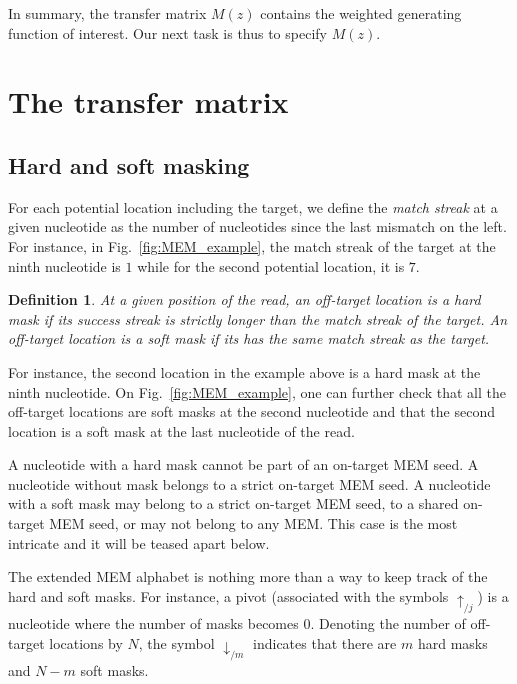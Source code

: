 \documentclass{article}
\newtheorem{definition}{Definition}
\begin{document}
In summary, the transfer matrix $M(z)$ contains the weighted generating
function of interest. Our next task is thus to specify $M(z)$.



\section{The transfer matrix}
\label{sec:transfer_mat}

\subsection{Hard and soft masking}

For each potential location including the target, we define the
\emph{match streak} at a given nucleotide as the number of nucleotides
since the last mismatch on the left. For instance, in
Fig.~\ref{fig:MEM_example}, the match streak of the target at the ninth
nucleotide is $1$ while for the second potential location, it is $7$.

\begin{definition}
At a given position of the read, an off-target location is a \emph{hard
mask} if its success streak is strictly longer than the match streak of
the target. An off-target location is a \emph{soft mask} if its has the
same match streak as the target.
\end{definition}

For instance, the second location in the example above is a hard mask at
the ninth nucleotide. On Fig.~\ref{fig:MEM_example}, one can further check
that all the off-target locations are soft masks at the second nucleotide
and that the second location is a soft mask at the last nucleotide of the
read.

A nucleotide with a hard mask cannot be part of an on-target MEM seed. A
nucleotide without mask belongs to a strict on-target MEM seed. A
nucleotide with a soft mask may belong to a strict on-target MEM seed, to
a shared on-target MEM seed, or may not belong to any MEM. This case is
the most intricate and it will be teased apart below.

The extended MEM alphabet is nothing more than a way to keep track of the
hard and soft masks. For instance, a pivot (associated with the symbols
$\uparrow_{/j}$) is a nucleotide where the number of masks becomes 0.
Denoting the number of off-target locations by $N$, the symbol
$\downarrow_{/m}$ indicates that there are $m$ hard masks and $N-m$ soft
masks.
\end{document}
